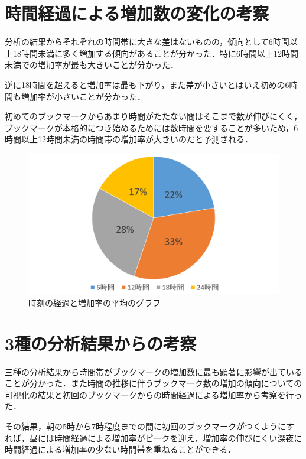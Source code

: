 \newpage

\section{時間経過による増加数の変化の考察}
分析の結果からそれぞれの時間帯に大きな差はないものの，傾向として6時間以上18時間未満に多く増加する傾向があることが分かった．特に6時間以上12時間未満での増加率が最も大きいことが分かった．\par
逆に18時間を超えると増加率は最も下がり，また差が小さいとはいえ初めの6時間も増加率が小さいことが分かった．\par
初めてのブックマークからあまり時間がたたない間はそこまで数が伸びにくく，ブックマークが本格的につき始めるためには数時間を要することが多いため，6時間以上12時間未満の時間帯の増加率が大きいのだと予測される．

\begin{figure}[htb]
\centering
\includegraphics[width=15cm]{en.pdf}
\caption{時刻の経過と増加率の平均のグラフ}\label{en}
\end{figure}

\newpage

\section{3種の分析結果からの考察}
三種の分析結果から時間帯がブックマークの増加数に最も顕著に影響が出ていることが分かった．また時間の推移に伴うブックマーク数の増加の傾向についての可視化の結果と初回のブックマークからの時間経過による増加率から考察を行った．\par
その結果，朝の5時から7時程度までの間に初回のブックマークがつくようにすれば，昼には時間経過による増加率がピークを迎え，増加率の伸びにくい深夜に時間経過による増加率の少ない時間帯を重ねることができる．

